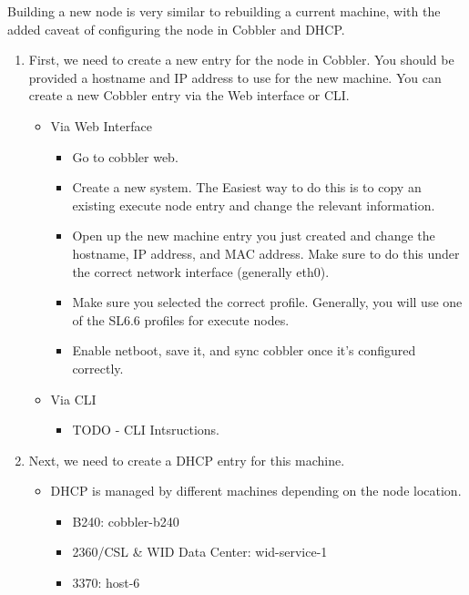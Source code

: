 \documentclass[10pt,letterpaper]{article}
\begin{document}
    Building a new node is very similar to rebuilding a current machine, with the
    added caveat of configuring the node in Cobbler and DHCP.
    \begin{enumerate}
        \item First, we need to create a new entry for the node in Cobbler. You
        should be provided a hostname and IP address to use for the new machine.
        You can create a new Cobbler entry via the Web interface or CLI.
        \begin{itemize}
            \item Via Web Interface
            \begin{itemize}
                \item Go to cobbler web.
                \item Create a new system. The Easiest way to do this is to copy
                an existing execute node entry and change the relevant information.
                \item Open up the new machine entry you just created and change the
                hostname, IP address, and MAC address. Make sure to do this under the
                correct network interface (generally eth0).
                \item Make sure you selected the correct profile. Generally,
                you will use one of the SL6.6 profiles for execute nodes.
                \item Enable netboot, save it, and sync cobbler once it's configured
                correctly.
            \end{itemize}
            \item Via CLI
            \begin{itemize}
                \item TODO - CLI Intsructions.
            \end{itemize}
        \end{itemize}
        \item Next, we need to create a DHCP entry for this machine.
        \begin{itemize}
            \item DHCP is managed by different machines depending on the node location.
            \begin{itemize}
                \item B240: cobbler-b240
                \item 2360/CSL \& WID Data Center: wid-service-1
                \item 3370: host-6

\end{itemize}
\end{itemize}
\end{enumerate}
\end{document}
